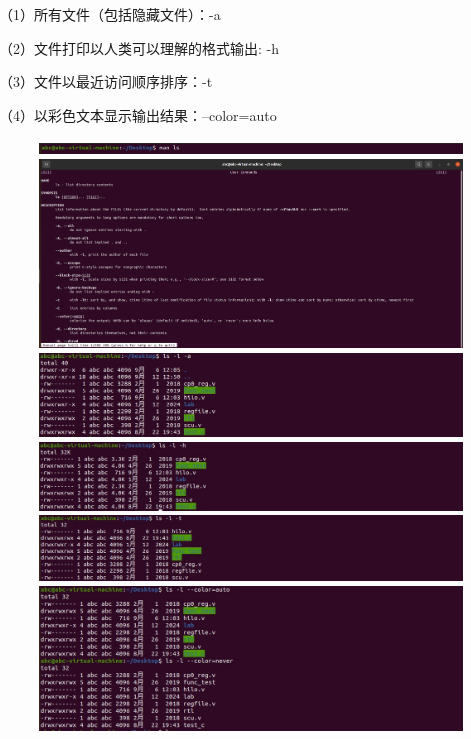 \documentclass[a4paper, 12pt]{article}
\begin{document}
	（1）所有文件（包括隐藏文件）：-a
	
	（2）文件打印以人类可以理解的格式输出: -h
	
	（3）文件以最近访问顺序排序：-t
	
	（4）以彩色文本显示输出结果：--color=auto
	
	\begin{figure}[H]
		\centering
		\includegraphics[width=1\textwidth]{002.jpg}
		\includegraphics[width=1\textwidth]{003.jpg}
		\includegraphics[width=1\textwidth]{004.jpg}
		\includegraphics[width=1\textwidth]{005.jpg}
		\includegraphics[width=1\textwidth]{006.jpg}
		\includegraphics[width=1\textwidth]{007.jpg}
	\end{figure}
	
\end{document}
